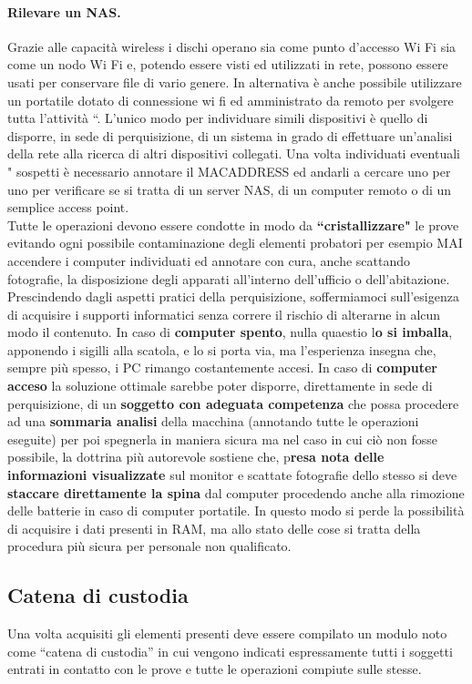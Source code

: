 \paragraph{Rilevare un NAS.}  Grazie alle capacità wireless i dischi operano sia come punto d'accesso Wi Fi sia come un nodo Wi Fi e, potendo essere visti ed utilizzati in rete, possono essere usati per conservare file di vario genere. In alternativa è anche possibile utilizzare un portatile dotato di connessione wi fi ed amministrato da remoto per svolgere tutta l'attività “. L'unico modo per individuare simili dispositivi è quello di disporre, in sede di perquisizione, di un sistema in grado di effettuare un'analisi della rete alla ricerca di
altri dispositivi collegati. Una volta individuati eventuali " sospetti è necessario annotare il MACADDRESS ed andarli a cercare uno per uno per verificare se si tratta di un server NAS, di un computer remoto o di un semplice access point.
\\
Tutte le operazioni devono essere condotte in modo da \textbf{“cristallizzare"} le prove evitando ogni possibile contaminazione degli elementi probatori per esempio MAI accendere i computer individuati ed annotare con cura, anche scattando fotografie, la disposizione degli apparati all'interno dell'ufficio o dell'abitazione. Prescindendo dagli aspetti pratici della perquisizione, soffermiamoci sull'esigenza di acquisire i supporti informatici senza correre il rischio di alterarne in alcun modo il contenuto.  In caso di \textbf{computer spento}, nulla quaestio l\textbf{o si imballa}, apponendo i sigilli alla scatola, e lo si porta via, ma l'esperienza insegna che, sempre più spesso, i PC rimango costantemente accesi. In caso di \textbf{computer acceso} la soluzione ottimale sarebbe poter disporre, direttamente in sede di perquisizione, di un \textbf{soggetto con adeguata competenza} che possa procedere ad una \textbf{sommaria analisi} della macchina (annotando tutte le operazioni eseguite) per poi spegnerla in maniera sicura ma nel caso in cui ciò non fosse possibile, la dottrina più autorevole sostiene che, p\textbf{resa nota delle informazioni visualizzate} sul monitor e scattate fotografie dello stesso si deve \textbf{staccare direttamente la spina} dal computer procedendo anche alla rimozione delle batterie in caso di computer portatile. In questo modo si perde la possibilità di acquisire i dati presenti in RAM, ma allo stato delle cose si tratta della procedura più sicura per personale non qualificato.


\subsection{Catena di custodia}
Una volta acquisiti gli elementi presenti deve essere compilato un modulo noto come “catena di custodia” in cui vengono indicati espressamente tutti i soggetti entrati in contatto con le prove e tutte le operazioni compiute sulle stesse. 

